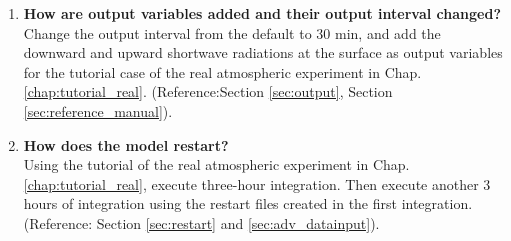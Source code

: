 \begin{enumerate}
\item {\bf How are output variables added and their output interval changed?}\\
Change the output interval from the default to 30 min, and add the downward and upward shortwave radiations at the surface as output variables for the tutorial case of the real atmospheric experiment in Chap. \ref{chap:tutorial_real}. (Reference:Section \ref{sec:output}, Section \ref{sec:reference_manual}).

\item {\bf How does the model restart?}\\
Using the tutorial of the real atmospheric experiment in Chap. \ref{chap:tutorial_real}, execute three-hour integration. Then execute another 3 hours of integration using the restart files created in the first integration.
(Reference: Section \ref{sec:restart} and \ref{sec:adv_datainput}).


\end{enumerate}


